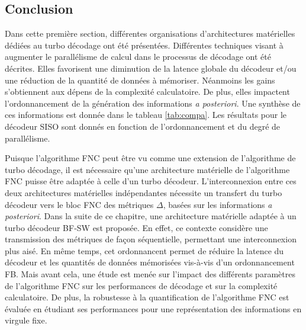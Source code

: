\subsection{Conclusion}
Dans cette première section, différentes organisations d'architectures matérielles dédiées au turbo décodage ont été présentées.
Différentes techniques visant à augmenter le parallélisme de calcul dans le processus de décodage ont été décrites. 
Elles favorisent une diminution de la 
latence globale du décodeur et/ou une réduction de la quantité de données à mémoriser. Néanmoins les gains s’obtiennent
aux dépens de la complexité calculatoire. De plus, elles impactent l'ordonnancement de la génération des informations 
\textit{a posteriori}. Une synthèse de ces informations est donnée dans le tableau \ref{tab:compa}. Les résultats pour le décodeur SISO sont donnés en fonction de l'ordonnancement et du degré de
parallélisme.

Puisque l'algorithme FNC peut être vu comme une extension de l'algorithme de turbo décodage, il est nécessaire qu'une architecture 
matérielle de l'algorithme FNC puisse être adaptée à celle d'un turbo décodeur. L'interconnexion entre ces deux architectures 
matérielles indépendantes nécessite un transfert du turbo décodeur vers le bloc FNC des métriques $\Delta$, basées sur les 
informations \textit{a posteriori}. Dans la suite de ce chapitre, une architecture matérielle adaptée à un turbo décodeur BF-SW 
 est proposée. En effet, ce contexte considère une transmission des métriques de façon séquentielle, permettant une 
 interconnexion plus aisé. En même temps, cet ordonnancent permet de réduire la latence du décodeur et les quantités de données mémorisées vis-à-vis d'un ordonnancement FB.
Mais avant cela, une étude est menée sur l'impact des différents paramètres de l'algorithme FNC sur les performances de 
décodage et sur la complexité calculatoire. De plus, la robustesse à la quantification de l'algorithme FNC est évaluée
en étudiant ses performances pour une représentation des informations en virgule fixe.

